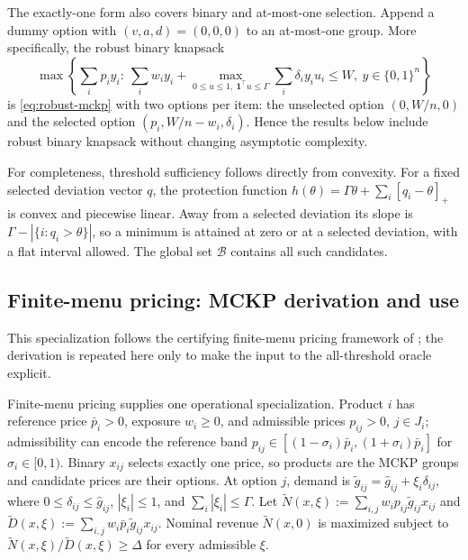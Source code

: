 \documentclass[11pt]{article}
\theoremstyle{plain}
\theoremstyle{definition}
\theoremstyle{remark}
\newcommand{\B}{\mathcal B}
\newcommand{\pos}[1]{[#1]_+}
\begin{document}
The exactly-one form also covers binary and at-most-one selection.  Append a dummy option with $(v,a,d)=(0,0,0)$ to an at-most-one group.  More specifically, the robust binary knapsack
\[
\max\left\{\sum_i p_i y_i:\ \sum_i w_i y_i+
\max_{0\le u\le1,\ \mathbf 1^\top u\le\Gamma}\sum_i\delta_i y_i u_i\le W,
\ y\in\{0,1\}^n\right\}
\]
is \eqref{eq:robust-mckp} with two options per item: the unselected option $(0,W/n,0)$ and the selected option $(p_i,W/n-w_i,\delta_i)$.  Hence the results below include robust binary knapsack without changing asymptotic complexity.

For completeness, threshold sufficiency follows directly from convexity.  For a fixed selected deviation vector $q$, the protection function $h(\theta)=\Gamma\theta+\sum_i\pos{q_i-\theta}$ is convex and piecewise linear.  Away from a selected deviation its slope is $\Gamma-|\{i:q_i>\theta\}|$, so a minimum is attained at zero or at a selected deviation, with a flat interval allowed.  The global set $\B$ contains all such candidates.

\subsection{Finite-menu pricing: MCKP derivation and use}\label{sec:pricing-specialization}

This specialization follows the certifying finite-menu pricing framework of \citet{Shao2026PaperA}; the derivation is repeated here only to make the input to the all-threshold oracle explicit.

Finite-menu pricing supplies one operational specialization.  Product $i$ has reference price $\bar p_i>0$, exposure $w_i\ge0$, and admissible prices $p_{ij}>0$, $j\in J_i$; admissibility can encode the reference band $p_{ij}\in[(1-\sigma_i)\bar p_i,(1+\sigma_i)\bar p_i]$ for $\sigma_i\in[0,1)$.  Binary $x_{ij}$ selects exactly one price, so products are the MCKP groups and candidate prices are their options.  At option $j$, demand is $\widetilde g_{ij}=\hat g_{ij}+\xi_i\delta_{ij}$, where $0\le\delta_{ij}\le\hat g_{ij}$, $|\xi_i|\le1$, and $\sum_i|\xi_i|\le\Gamma$.  Let $\widetilde N(x,\xi):=\sum_{i,j}w_ip_{ij}\widetilde g_{ij}x_{ij}$ and $\widetilde D(x,\xi):=\sum_{i,j}w_i\bar p_i\widetilde g_{ij}x_{ij}$.  Nominal revenue $\widetilde N(x,0)$ is maximized subject to $\widetilde N(x,\xi)/\widetilde D(x,\xi)\ge\Delta$ for every admissible $\xi$.
\end{document}
